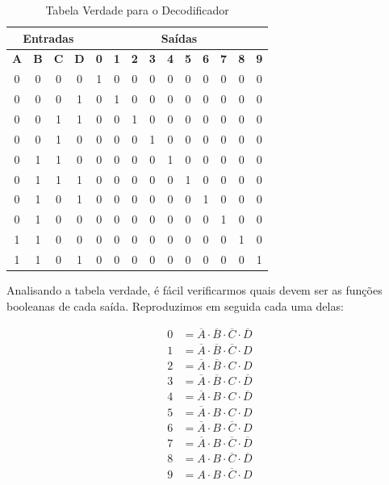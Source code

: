 \documentclass[12pt]{article}
\begin{document}
\begin{table}[H]
    \centering
    \caption{Tabela Verdade para o Decodificador}
    \begin{tabular}{|c|c|c|c||c|c|c|c|c|c|c|c|c|c|}\hline
    \multicolumn{4}{|c||}{Entradas} & \multicolumn{10}{|c|}{Saídas} \\\hline
    \textbf{A} & \textbf{B} & \textbf{C} & \textbf{D} & \textbf{0} & \textbf{1} & \textbf{2} & \textbf{3} & \textbf{4} & \textbf{5} & \textbf{6} & \textbf{7} & \textbf{8} & \textbf{9} \\\hline
    0 & 0 & 0 & 0 & 1 & 0 & 0 & 0 & 0 & 0 & 0 & 0 & 0 & 0 \\\hline
    0 & 0 & 0 & 1 & 0 & 1 & 0 & 0 & 0 & 0 & 0 & 0 & 0 & 0 \\\hline
    0 & 0 & 1 & 1 & 0 & 0 & 1 & 0 & 0 & 0 & 0 & 0 & 0 & 0 \\\hline
    0 & 0 & 1 & 0 & 0 & 0 & 0 & 1 & 0 & 0 & 0 & 0 & 0 & 0 \\\hline
    0 & 1 & 1 & 0 & 0 & 0 & 0 & 0 & 1 & 0 & 0 & 0 & 0 & 0 \\\hline
    0 & 1 & 1 & 1 & 0 & 0 & 0 & 0 & 0 & 1 & 0 & 0 & 0 & 0 \\\hline
    0 & 1 & 0 & 1 & 0 & 0 & 0 & 0 & 0 & 0 & 1 & 0 & 0 & 0 \\\hline
    0 & 1 & 0 & 0 & 0 & 0 & 0 & 0 & 0 & 0 & 0 & 1 & 0 & 0 \\\hline
    1 & 1 & 0 & 0 & 0 & 0 & 0 & 0 & 0 & 0 & 0 & 0 & 1 & 0 \\\hline
    1 & 1 & 0 & 1 & 0 & 0 & 0 & 0 & 0 & 0 & 0 & 0 & 0 & 1 \\\hline
    \end{tabular}\label{tab:tabela_and}
\end{table}

Analisando a tabela verdade, é fácil verificarmos quais devem ser as funções
booleanas de cada saída. Reproduzimos em seguida cada uma delas:

\begin{align}
0 &= \overline{A} \cdot \overline{B} \cdot \overline{C} \cdot \overline{D} \\
1 &= \overline{A} \cdot \overline{B} \cdot \overline{C} \cdot D \\
2 &= \overline{A} \cdot \overline{B} \cdot C \cdot D \\
3 &= \overline{A} \cdot \overline{B} \cdot C \cdot \overline{D} \\
4 &= \overline{A} \cdot B \cdot C \cdot \overline{D} \\
5 &= \overline{A} \cdot B \cdot C \cdot D \\
6 &= \overline{A} \cdot B \cdot \overline{C} \cdot D \\
7 &= \overline{A} \cdot B \cdot \overline{C} \cdot \overline{D} \\
8 &= A \cdot B \cdot \overline{C} \cdot \overline{D} \\
9 &= A \cdot B \cdot \overline{C} \cdot D
\end{align}
\end{document}
